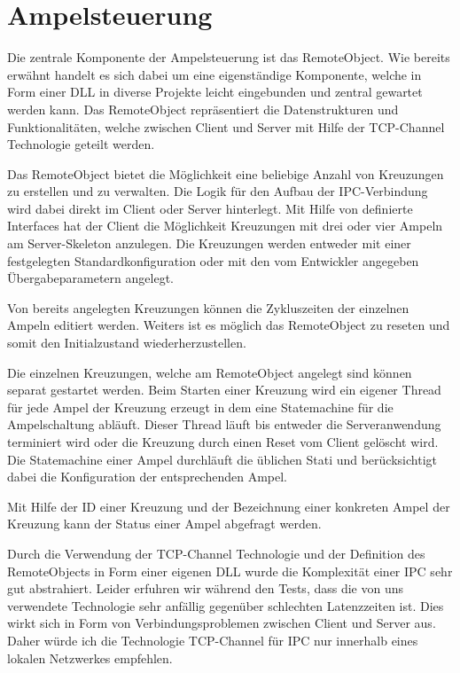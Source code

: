 \section{Ampelsteuerung}

Die zentrale Komponente der Ampelsteuerung ist das RemoteObject. Wie bereits erwähnt handelt es sich dabei um eine eigenständige Komponente, welche in Form einer DLL in diverse Projekte leicht eingebunden und zentral gewartet werden kann. Das RemoteObject repräsentiert die Datenstrukturen und Funktionalitäten, welche zwischen Client und Server mit Hilfe der TCP-Channel Technologie geteilt werden.

Das RemoteObject bietet die Möglichkeit eine beliebige Anzahl von Kreuzungen zu erstellen und zu verwalten. Die Logik für den Aufbau der IPC-Verbindung wird dabei direkt im Client oder Server hinterlegt. Mit Hilfe von definierte Interfaces hat der Client die Möglichkeit Kreuzungen mit drei oder vier Ampeln am Server-Skeleton anzulegen. Die Kreuzungen werden entweder mit einer festgelegten Standardkonfiguration oder mit den vom Entwickler angegeben Übergabeparametern angelegt.

Von bereits angelegten Kreuzungen können die Zykluszeiten der einzelnen Ampeln editiert werden. Weiters ist es möglich das RemoteObject zu reseten und somit den Initialzustand wiederherzustellen.

Die einzelnen Kreuzungen, welche am RemoteObject angelegt sind können separat gestartet werden. Beim Starten einer Kreuzung wird ein eigener Thread für jede Ampel der Kreuzung erzeugt in dem eine Statemachine für die Ampelschaltung abläuft. Dieser Thread läuft bis entweder die Serveranwendung terminiert wird oder die Kreuzung durch einen Reset vom Client gelöscht wird. Die Statemachine einer Ampel durchläuft die üblichen Stati und berücksichtigt dabei die Konfiguration der entsprechenden Ampel. 

Mit Hilfe der ID einer Kreuzung und der Bezeichnung einer konkreten Ampel der Kreuzung kann der Status einer Ampel abgefragt werden.

Durch die Verwendung der TCP-Channel Technologie und der Definition des RemoteObjects in Form einer eigenen DLL wurde die Komplexität einer IPC sehr gut abstrahiert. Leider erfuhren wir während den Tests, dass die von uns verwendete Technologie sehr anfällig gegenüber schlechten Latenzzeiten ist. Dies wirkt sich in Form von Verbindungsproblemen zwischen Client und Server aus. Daher würde ich die Technologie TCP-Channel für IPC nur innerhalb eines lokalen Netzwerkes empfehlen.


